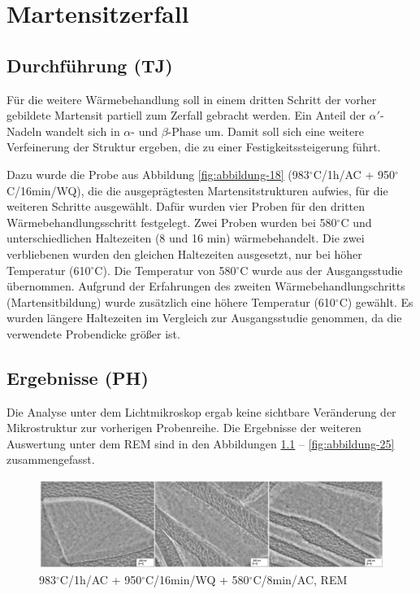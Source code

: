\chapter{Martensitzerfall}

\section{Durchführung (TJ)}

Für die weitere Wärmebehandlung soll in einem dritten Schritt der vorher gebildete Martensit partiell zum Zerfall gebracht werden. Ein Anteil der $\alpha'$-Nadeln wandelt sich in $\alpha$- und $\beta$-Phase um. Damit soll sich eine weitere Verfeinerung der Struktur ergeben, die zu einer Festigkeitssteigerung führt.

Dazu wurde die Probe aus Abbildung \ref{fig:abbildung-18} (983$^\circ$C/1h/AC + 950$^\circ$C/16min/WQ), die die ausgeprägtesten Martensitstrukturen aufwies, für die weiteren Schritte ausgewählt. 
Dafür wurden vier Proben für den dritten Wärmebehandlungsschritt festgelegt. Zwei Proben wurden bei 580$^\circ$C und unterschiedlichen Haltezeiten (8 und 16 min) wärmebehandelt. Die zwei verbliebenen wurden den gleichen Haltezeiten ausgesetzt, nur bei höher Temperatur (610$^\circ$C).
Die Temperatur von 580$^\circ$C wurde aus der Ausgangsstudie übernommen. Aufgrund der Erfahrungen des zweiten Wärmebehandlungschritts (Martensitbildung) wurde zusätzlich eine höhere Temperatur (610$^\circ$C) gewählt.
Es wurden längere Haltezeiten im Vergleich zur Ausgangsstudie genommen, da die verwendete Probendicke größer ist.

\section{Ergebnisse (PH)}

Die Analyse unter dem Lichtmikroskop ergab keine sichtbare Veränderung der Mikrostruktur zur vorherigen Probenreihe. Die Ergebnisse der weiteren Auswertung unter dem REM sind in den Abbildungen \ref{fig:abbildung-22} -- \ref{fig:abbildung-25} zusammengefasst.

\begin{figure}
	\centering
	\includegraphics[width=1.0\linewidth]{./Bilder/Abbildung 22.png}
	\caption[Abbildung 22]{983$^\circ$C/1h/AC + 950$^\circ$C/16min/WQ + 580$^\circ$C/8min/AC, REM}
	\label{fig:abbildung-22}
\end{figure}

